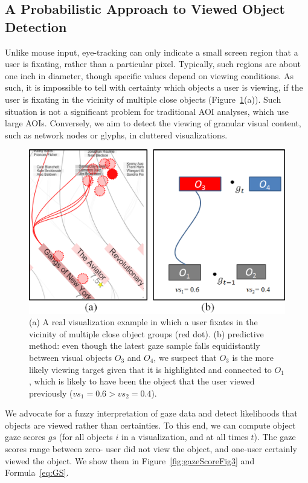\subsection{A Probabilistic Approach to Viewed Object Detection}
\label{sec:ProbabilisticObjectDetection}

Unlike mouse input, eye-tracking can only indicate a small screen region that a user is fixating, rather than a particular pixel. Typically, such regions are about one inch in diameter, though specific values depend on viewing conditions. As such, it is impossible to tell with certainty which objects a user is viewing, if the user is fixating in the vicinity of multiple close objects (Figure~\ref{fig:discreminateFig4}(a)). Such situation is not a significant problem for traditional AOI analyses, which use large AOIs. Conversely, we aim to detect the viewing of granular visual content, such as network nodes or glyphs, in cluttered visualizations.

\begin{figure}[htb]
  \centering
  \includegraphics[width=\linewidth]{images/discreminateFig4.eps}
  \caption{(a) A real visualization example in which a user fixates in the vicinity of multiple close object groups (red dot). (b) predictive method: even though the latest gaze sample falls equidistantly between visual objects $O_3$ and $O_4$, we suspect that $O_3$ is the more likely viewing target given that it is highlighted and connected to $O_1$, which is likely to have been the object that the user viewed previously ($vs_1=0.6 > vs_2 = 0.4$). }
	\label{fig:discreminateFig4}
\end{figure}

We advocate for a fuzzy interpretation of gaze data and detect likelihoods that objects are viewed rather than certainties. To this end, we can compute object gaze scores $gs$ (for all objects $i$ in a visualization, and at all times $t$). The gaze scores range between zero- user did not view the object, and one-user certainly viewed the object. We show them in Figure~\ref{fig:gazeScoreFig3} and Formula~\ref{eq:GS}. 

